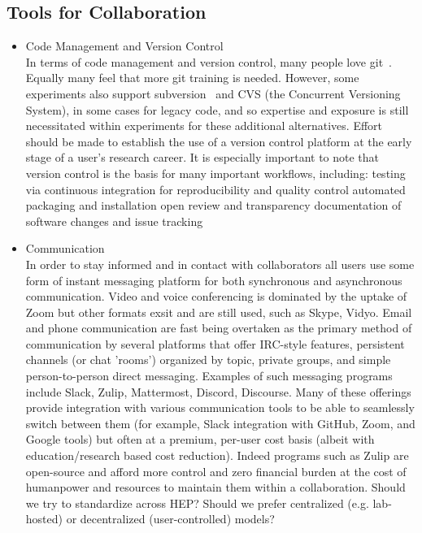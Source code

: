 \subsection{Tools for Collaboration}

\begin{itemize} 
  \item Code Management and Version Control\\
In terms of code management and version control, many people love git~\cite{chacon2014pro}. Equally many feel that more git training is needed. However, some experiments also support subversion~\cite{subversion} and CVS (the Concurrent Versioning System), in some cases for legacy code, and so expertise and exposure is still necessitated
within experiments for these additional alternatives. Effort should be made to establish the use of a version control platform at the early stage of a user's research career. It is especially important to note that version control is the basis for many important workflows, including:
       \subitem testing via continuous integration for reproducibility and quality control
       \subitem automated packaging and installation
       \subitem open review and transparency
       \subitem documentation of software changes and issue tracking       
  \item Communication\\
In order to stay informed and in contact with collaborators all users use some form of instant messaging platform for both synchronous and asynchronous communication. Video and voice conferencing is dominated by the uptake of Zoom but other formats exsit and are still used, such as Skype, Vidyo. Email and phone communication are fast being overtaken as the primary method of communication by several platforms that offer IRC-style features, persistent channels (or chat 'rooms') organized by topic, private groups, and simple person-to-person direct messaging. Examples of such messaging programs include Slack, Zulip, Mattermost, Discord, Discourse. 
Many of these offerings provide integration with various communication tools to be able to seamlessly switch between them (for example, Slack integration with GitHub, Zoom, and Google tools) but often at a premium, per-user cost basis (albeit with education/research based cost reduction). Indeed programs such as Zulip are open-source and afford more control and zero financial burden at the cost of humanpower and resources to maintain them within a collaboration.
Should we try to standardize across HEP?
Should we prefer centralized (e.g. lab-hosted) or decentralized (user-controlled) models?

\end{itemize}

